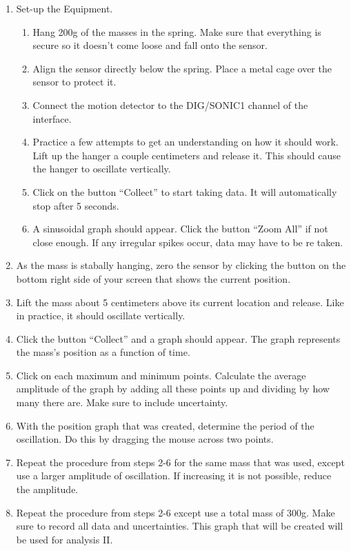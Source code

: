 \begin{enumerate}
	\item {Set-up the Equipment.}
	\begin{enumerate}
	\item {Hang 200g of the masses in the spring. Make sure that everything is secure so it doesn't come loose and fall onto the sensor.}
	\item {Align the sensor directly below the spring. Place a metal cage over the sensor to protect it.}
	\item {Connect the motion detector to the DIG/SONIC1 channel of the interface.}
	\item {Practice a few attempts to get an understanding on how it should work. Lift up the hanger a couple centimeters and release it. This should cause the hanger to oscillate vertically.}
	\item {Click on the button “Collect” to start taking data. It will automatically stop after 5 seconds.}
	\item {A sinusoidal graph should appear. Click the button “Zoom All” if not close enough. If any irregular spikes occur, data may have to be re taken.}
	\end{enumerate}
	\item {As the mass is stabally hanging, zero the sensor by clicking the button on the bottom right side of your screen that shows the current position.}
	\item {Lift the mass about 5 centimeters above its current location and release. Like in practice, it should oscillate vertically.}
	\item {Click the button “Collect” and a graph should appear. The graph represents the mass’s position as a function of time.}
	\item {Click on each maximum and minimum points. Calculate the average amplitude of the graph by adding all these points up and dividing by how many there are. Make sure to include uncertainty.}
	\item {With the position graph that was created, determine the period of the oscillation. Do this by dragging the mouse across two points.}
	\item {Repeat the procedure from steps 2-6 for the same mass that was used, except use a larger amplitude of oscillation. If increasing it is not possible, reduce the amplitude.}
	\item {Repeat the procedure from steps 2-6 except use a total mass of 300g. Make sure to record all data and uncertainties. This graph that will be created will be used for analysis II.}
\end{enumerate}


